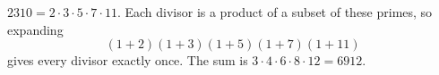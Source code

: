 $2310=2\cdot3\cdot5\cdot7\cdot11$. Each divisor is a product of a subset of these primes, so expanding
\[(1+2)(1+3)(1+5)(1+7)(1+11)\]
gives every divisor exactly once. The sum is $3\cdot4\cdot6\cdot8\cdot12=\boxed{6912}$.
